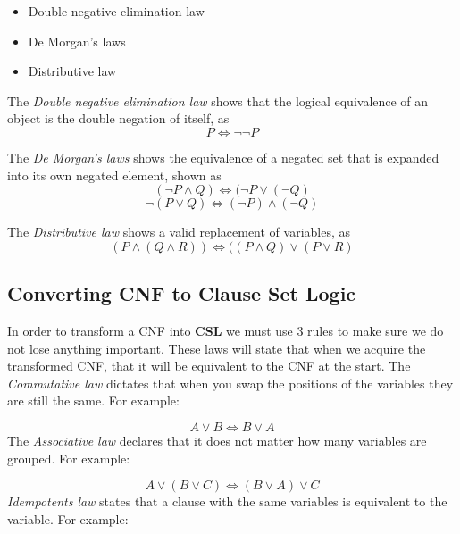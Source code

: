 \documentclass[11pt,a4paper, notitlepage]{report}
\begin{document}
\begin{itemize}
\item Double negative elimination law
\item De Morgan's laws
\item Distributive law
\end{itemize}


The \emph{Double negative elimination law} shows that the logical equivalence of an object is the double negation of itself, as
\begin{displaymath}
P \Leftrightarrow \neg \neg P
\end{displaymath}

The \emph{De Morgan's laws} shows the equivalence of a negated set that is expanded into its own negated element, shown as
\begin{displaymath}
(\neg P \land Q) \Leftrightarrow (\neg P \lor (\neg Q)
\end{displaymath}
\begin{displaymath}
\neg(P \lor Q) \Leftrightarrow (\neg P) \land (\neg Q)
\end{displaymath}


The \emph{Distributive law} shows a valid replacement of variables, as
\begin{displaymath}
(P \land (Q \land R)) \Leftrightarrow ((P \land Q) \lor (P \lor R)
\end{displaymath}


\subsection{Converting CNF to Clause Set Logic}
\label{subsec:ConvertCNF}

In order to transform a CNF into \textbf{CSL} we must use 3 rules to make sure we do not lose anything important. These laws will state that when we acquire the transformed CNF, that it will be equivalent to the CNF at the start.
The \emph{Commutative law} dictates that when you swap the positions of the variables they are still the same. For example:

\begin{displaymath}
A \lor B \Leftrightarrow B \lor A
\end{displaymath}
The \emph{Associative law} declares that it does not matter how many variables are grouped. For example:

\begin{displaymath}
A \lor (B \lor C) \Leftrightarrow (B \lor A) \lor C
\end{displaymath}
\emph{Idempotents law} states that a clause with the same variables is equivalent to the variable. For example:
\end{document}
